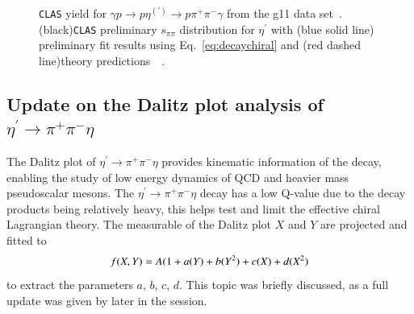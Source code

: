 \documentclass[epj]{webofc}
\begin{document}
\begin{figure}[h!]
		\caption[Something]{\label{fig:g11rad_decay}\textsc{\texttt{CLAS}} yield for $\gamma p \to p \eta^{(\prime)} \to p \pi^+ \pi^- \gamma $ from the g11 data set~.(black)\textsc{\texttt{CLAS}} preliminary $s_{\pi\pi}$ distribution for $\eta^{\prime}$ with (blue solid line) preliminary fit results using Eq.~\ref{eq:decaychiral} and (red dashed line)theory predictions~\cite{Kubis2015}~.}
		
\end{figure}
\FloatBarrier
\subsection{Update on the Dalitz plot analysis of $\eta^{\prime} \to \pi^+ \pi^- \eta$}
The Dalitz plot of $\eta^{\prime} \to \pi^+ \pi^- \eta$ provides kinematic information of the decay, enabling the study of low energy dynamics of QCD and heavier mass pseudoscalar mesons. The  $\eta^{\prime} \to \pi^+ \pi^- \eta$ decay has a low Q-value due to the decay products being relatively heavy, this helps test and limit the effective chiral Lagrangian theory. The measurable of the Dalitz plot $X$ and $Y$ are projected and fitted to  %
\begin{equation}
f(X,Y) = A(1+a(Y) + b (Y^2) + c(X) + d(X^2)  \label{eq:dalitzpro} \\
\end{equation}
to extract the parameters $a$, $b$, $c$, $d$.
%
This topic was briefly discussed, as a full update was given by later in the session.
\FloatBarrier
\end{document}
